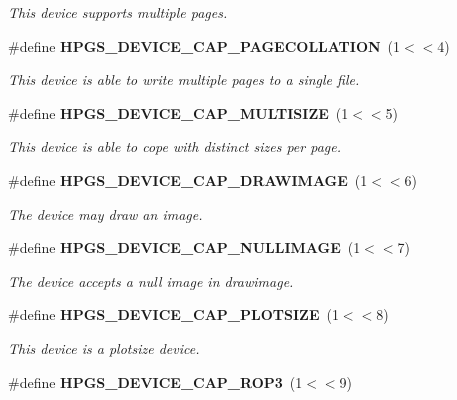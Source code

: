 \begin{CompactItemize}
\begin{CompactList}\small\item\em This device supports multiple pages. \item\end{CompactList}\item 
\#define {\bf HPGS\_\-DEVICE\_\-CAP\_\-PAGECOLLATION}~(1$<$$<$4)\label{group__device_g47c1e796774cc9019de505639ba2d8b4}

\begin{CompactList}\small\item\em This device is able to write multiple pages to a single file. \item\end{CompactList}\item 
\#define {\bf HPGS\_\-DEVICE\_\-CAP\_\-MULTISIZE}~(1$<$$<$5)\label{group__device_g74b3043329761f6c48088374cb2645d0}

\begin{CompactList}\small\item\em This device is able to cope with distinct sizes per page. \item\end{CompactList}\item 
\#define {\bf HPGS\_\-DEVICE\_\-CAP\_\-DRAWIMAGE}~(1$<$$<$6)\label{group__device_g0e8d3be8de1ccdc0c814a7d4f50d5ea5}

\begin{CompactList}\small\item\em The device may draw an image. \item\end{CompactList}\item 
\#define {\bf HPGS\_\-DEVICE\_\-CAP\_\-NULLIMAGE}~(1$<$$<$7)\label{group__device_g137bf6ecfa0799889cc3338b3e6e57cf}

\begin{CompactList}\small\item\em The device accepts a null image in drawimage. \item\end{CompactList}\item 
\#define {\bf HPGS\_\-DEVICE\_\-CAP\_\-PLOTSIZE}~(1$<$$<$8)\label{group__device_g6fc3e52dd7ac9e001d1148b075d16e4c}

\begin{CompactList}\small\item\em This device is a plotsize device. \item\end{CompactList}\item 
\#define {\bf HPGS\_\-DEVICE\_\-CAP\_\-ROP3}~(1$<$$<$9)\label{group__device_g35207578b9faef0e1602a6600c73dd39}


\end{CompactItemize}
